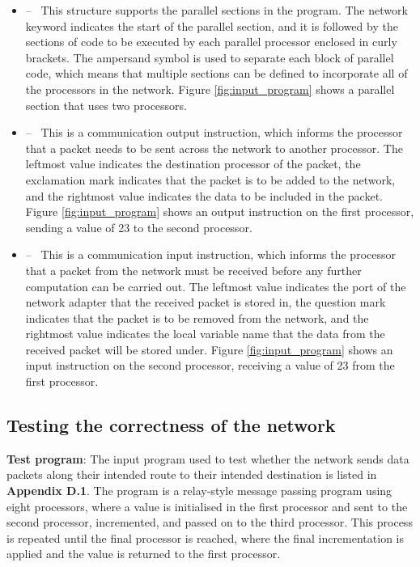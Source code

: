 \documentclass[a4paper, 12pt]{article}
\begin{document}
\begin{itemize}
	\item {} -- \ This structure supports the parallel sections in the program. The network keyword indicates the start of the parallel section, and it is followed by the sections of code to be executed by each parallel processor enclosed in curly brackets. The ampersand symbol is used to separate each block of parallel code, which means that multiple sections can be defined to incorporate all of the processors in the network. Figure \ref{fig:input_program} shows a parallel section that uses two processors.
	\item {} -- \ This is a communication output instruction, which informs the processor that a packet needs to be sent across the network to another processor. The leftmost value indicates the destination processor of the packet, the exclamation mark indicates that the packet is to be added to the network, and the rightmost value indicates the data to be included in the packet. Figure \ref{fig:input_program} shows an output instruction on the first processor, sending a value of 23 to the second processor.
	\item {} -- \ This is a communication input instruction, which informs the processor that a packet from the network must be received before any further computation can be carried out. The leftmost value indicates the port of the network adapter that the received packet is stored in, the question mark indicates that the packet is to be removed from the network, and the rightmost value indicates the local variable name that the data from the received packet will be stored under.   Figure \ref{fig:input_program} shows an input instruction on the second processor, receiving a value of 23 from the first processor.
\end{itemize}

\subsection{Testing the correctness of the network}

\textbf{Test program}: The input program used to test whether the network sends data packets along their intended route to their intended destination is listed in \textbf{Appendix D.1}. The program is a relay-style message passing program using eight processors, where a value is initialised in the first processor and sent to the second processor, incremented, and passed on to the third processor. This process is repeated until the final processor is reached, where the final incrementation is applied and the value is returned to the first processor.
\end{document}
